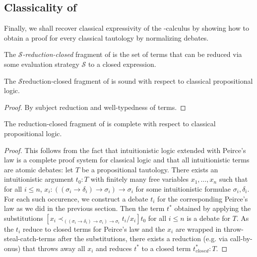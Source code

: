 \documentclass{IOS-Book-Article}
\begin{document}
\subsection{Classicality of \ACDC}

Finally, we shall recover classical expressivity of the \matilda-calculus by showing how to obtain a proof for every classical tautology by normalizing \ACDC debates.

\begin{definition}
  The \emph{$\mathcal{S}$-reduction-closed} fragment of \ACDC is the set of \ACDC terms that can be reduced via some evaluation strategy $\mathcal{S}$ to a closed \matilda expression.
\end{definition}

\begin{proposition}
  The $\mathcal{S}$reduction-closed fragment of \ACDC is sound with respect to classical propositional logic.
\end{proposition}
\begin{proof}
  By subject reduction and well-typedness of \ACDC terms. %
\end{proof}

\begin{proposition}
  The reduction-closed fragment of \ACDC is complete with respect to classical propositional logic.
\end{proposition}
\begin{proof}
  This follows from the fact that intuitionistic logic extended with Peirce's law is a complete proof system for classical logic and that all intuitionistic terms are atomic \ACDC debates: let $T$ be a propositional tautology. There exists an intuitionistic argument $t_0:T$ with finitely many free variables $x_1,\dots,x_n$ such that for all $i\leq n$, $x_i:((\sigma_i\rightarrow \delta_i)\rightarrow \sigma_i) \rightarrow \sigma_i$ for some intuitionistic formulae $\sigma_i, \delta_i$. For each such occurence, we construct a debate $t_i$ for the corresponding Peirce's law as we did in the previous section. Then the term $t^\ast$ obtained by applying the substitutions $[x_i \prec_{((\sigma_i\rightarrow \delta_i)\rightarrow \sigma_i) \rightarrow \sigma_i} t_i/x_i]t_0$ for all $i\leq n$ is a debate for $T$. As the $t_i$ reduce to closed terms for Peirce's law and the $x_i$ are wrapped in throw-steal-catch-terms after the substitutions, there exists a reduction (e.g. via call-by-onus) that throws away all $x_i$ and reduces $t^\ast$ to a closed term $t^\ast_{closed}:T$.  
\end{proof}
\end{document}
